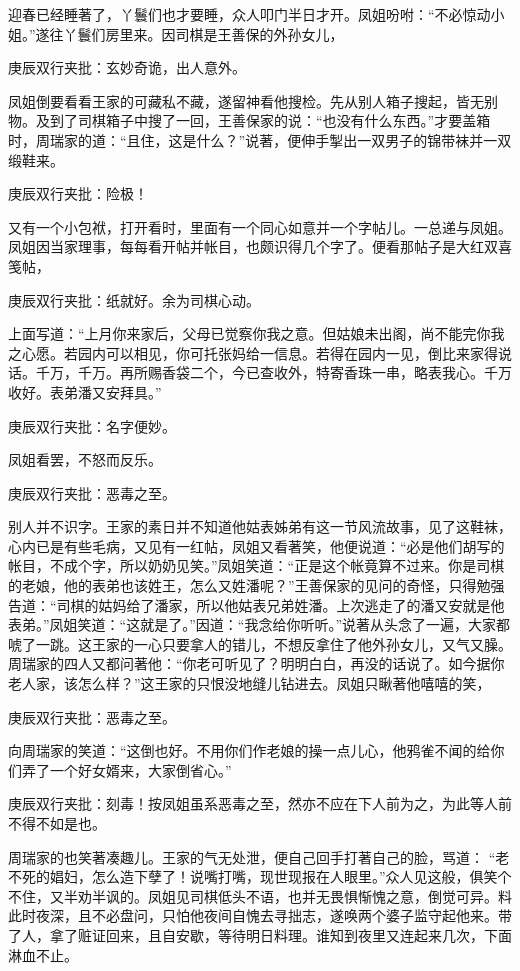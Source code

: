 \begin{parag}


    迎春已经睡著了，丫鬟们也才要睡，众人叩门半日才开。凤姐吩咐：“不必惊动小姐。”遂往丫鬟们房里来。因司棋是王善保的外孙女儿，\begin{note}庚辰双行夹批：玄妙奇诡，出人意外。\end{note}凤姐倒要看看王家的可藏私不藏，遂留神看他搜检。先从别人箱子搜起，皆无别物。及到了司棋箱子中搜了一回，王善保家的说：“也没有什么东西。”才要盖箱时，周瑞家的道：“且住，这是什么？”说著，便伸手掣出一双男子的锦带袜并一双缎鞋来。\begin{note}庚辰双行夹批：险极！\end{note}又有一个小包袱，打开看时，里面有一个同心如意并一个字帖儿。一总递与凤姐。凤姐因当家理事，每每看开帖并帐目，也颇识得几个字了。便看那帖子是大红双喜笺帖，\begin{note}庚辰双行夹批：纸就好。余为司棋心动。\end{note}上面写道：“上月你来家后，父母已觉察你我之意。但姑娘未出阁，尚不能完你我之心愿。若园内可以相见，你可托张妈给一信息。若得在园内一见，倒比来家得说话。千万，千万。再所赐香袋二个，今已查收外，特寄香珠一串，略表我心。千万收好。表弟潘又安拜具。”\begin{note}庚辰双行夹批：名字便妙。\end{note}凤姐看罢，不怒而反乐。\begin{note}庚辰双行夹批：恶毒之至。\end{note}别人并不识字。王家的素日并不知道他姑表姊弟有这一节风流故事，见了这鞋袜，心内已是有些毛病，又见有一红帖，凤姐又看著笑，他便说道：“必是他们胡写的帐目，不成个字，所以奶奶见笑。”凤姐笑道：“正是这个帐竟算不过来。你是司棋的老娘，他的表弟也该姓王，怎么又姓潘呢？”王善保家的见问的奇怪，只得勉强告道：“司棋的姑妈给了潘家，所以他姑表兄弟姓潘。上次逃走了的潘又安就是他表弟。”凤姐笑道：“这就是了。”因道：“我念给你听听。”说著从头念了一遍，大家都唬了一跳。这王家的一心只要拿人的错儿，不想反拿住了他外孙女儿，又气又臊。周瑞家的四人又都问著他：“你老可听见了？明明白白，再没的话说了。如今据你老人家，该怎么样？”这王家的只恨没地缝儿钻进去。凤姐只瞅著他嘻嘻的笑，\begin{note}庚辰双行夹批：恶毒之至。\end{note}向周瑞家的笑道：“这倒也好。不用你们作老娘的操一点儿心，他鸦雀不闻的给你们弄了一个好女婿来，大家倒省心。”\begin{note}庚辰双行夹批：刻毒！按凤姐虽系恶毒之至，然亦不应在下人前为之，为此等人前不得不如是也。\end{note}周瑞家的也笑著凑趣儿。王家的气无处泄，便自己回手打著自己的脸，骂道： “老不死的娼妇，怎么造下孽了！说嘴打嘴，现世现报在人眼里。”众人见这般，俱笑个不住，又半劝半讽的。凤姐见司棋低头不语，也并无畏惧惭愧之意，倒觉可异。料此时夜深，且不必盘问，只怕他夜间自愧去寻拙志，遂唤两个婆子监守起他来。带了人，拿了赃证回来，且自安歇，等待明日料理。谁知到夜里又连起来几次，下面淋血不止。
\end{parag}


